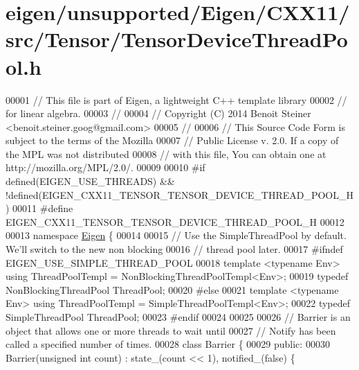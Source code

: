 \hypertarget{eigen_2unsupported_2_eigen_2_c_x_x11_2src_2_tensor_2_tensor_device_thread_pool_8h_source}{}\section{eigen/unsupported/\+Eigen/\+C\+X\+X11/src/\+Tensor/\+Tensor\+Device\+Thread\+Pool.h}
\label{eigen_2unsupported_2_eigen_2_c_x_x11_2src_2_tensor_2_tensor_device_thread_pool_8h_source}

\begin{DoxyCode}
00001 \textcolor{comment}{// This file is part of Eigen, a lightweight C++ template library}
00002 \textcolor{comment}{// for linear algebra.}
00003 \textcolor{comment}{//}
00004 \textcolor{comment}{// Copyright (C) 2014 Benoit Steiner <benoit.steiner.goog@gmail.com>}
00005 \textcolor{comment}{//}
00006 \textcolor{comment}{// This Source Code Form is subject to the terms of the Mozilla}
00007 \textcolor{comment}{// Public License v. 2.0. If a copy of the MPL was not distributed}
00008 \textcolor{comment}{// with this file, You can obtain one at http://mozilla.org/MPL/2.0/.}
00009 
00010 \textcolor{preprocessor}{#if defined(EIGEN\_USE\_THREADS) && !defined(EIGEN\_CXX11\_TENSOR\_TENSOR\_DEVICE\_THREAD\_POOL\_H)}
00011 \textcolor{preprocessor}{#define EIGEN\_CXX11\_TENSOR\_TENSOR\_DEVICE\_THREAD\_POOL\_H}
00012 
00013 \textcolor{keyword}{namespace }\hyperlink{namespace_eigen}{Eigen} \{
00014 
00015 \textcolor{comment}{// Use the SimpleThreadPool by default. We'll switch to the new non blocking}
00016 \textcolor{comment}{// thread pool later.}
00017 \textcolor{preprocessor}{#ifndef EIGEN\_USE\_SIMPLE\_THREAD\_POOL}
00018 \textcolor{keyword}{template} <\textcolor{keyword}{typename} Env> \textcolor{keyword}{using} ThreadPoolTempl = NonBlockingThreadPoolTempl<Env>;
00019 \textcolor{keyword}{typedef} NonBlockingThreadPool ThreadPool;
00020 \textcolor{preprocessor}{#else}
00021 \textcolor{keyword}{template} <\textcolor{keyword}{typename} Env> \textcolor{keyword}{using} ThreadPoolTempl = SimpleThreadPoolTempl<Env>;
00022 \textcolor{keyword}{typedef} SimpleThreadPool ThreadPool;
00023 \textcolor{preprocessor}{#endif}
00024 
00025 
00026 \textcolor{comment}{// Barrier is an object that allows one or more threads to wait until}
00027 \textcolor{comment}{// Notify has been called a specified number of times.}
00028 \textcolor{keyword}{class }Barrier \{
00029  \textcolor{keyword}{public}:
00030   Barrier(\textcolor{keywordtype}{unsigned} \textcolor{keywordtype}{int} count) : state\_(count << 1), notified\_(false) \{

\end{DoxyCode}
